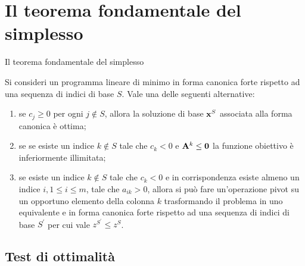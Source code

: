 \documentclass{beamer}
\begin{document}
\generatitolo

\section{Il teorema fondamentale del simplesso}

\begin{frame}[allowframebreaks]{Il teorema fondamentale del simplesso}

Si consideri un programma lineare di minimo in forma canonica forte rispetto ad una sequenza di indici di base $S$. Vale una delle seguenti alternative:

\begin{theorem}
\begin{enumerate}
\item se  $c_j \geq 0$ per ogni $j \notin S$, allora la soluzione di base $\mathbf{x}^S$ associata alla forma canonica \`e ottima;

\item se se esiste un indice $k \notin S$ tale che $c_k < 0$ e $\mathbf{A}^k \leq \mathbf{0}$ la funzione obiettivo \`e inferiormente illimitata;

\item se esiste un indice $k \notin S$ tale che $c_k < 0$ e in corrispondenza esiste almeno un indice $i, 1 \leq i \leq m$, tale che $a_{ik} > 0$, allora si pu\`o fare un'operazione pivot su un opportuno elemento della colonna $k$ trasformando il problema in uno equivalente e in forma canonica forte rispetto ad una sequenza di indici di base $S^\prime$ per cui vale $z^{S^\prime} \leq z^S$.
\end{enumerate}
\end{theorem}
\end{frame}

\subsection{Test di ottimalit\`a}
\end{document}
